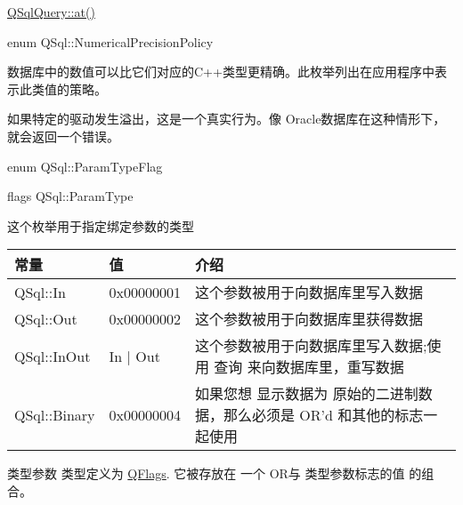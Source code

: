\begin{notice}[另请参阅]
\href{https://doc.qt.io/qt-5/qsqlquery.html#at}{QSqlQuery::at()}
\end{notice}

enum QSql::NumericalPrecisionPolicy


数据库中的数值可以比它们对应的C++类型更精确。此枚举列出在应用程序中表示此类值的策略。



\begin{notice}
如果特定的驱动发生溢出，这是一个真实行为。像 Oracle数据库在这种情形下，就会返回一个错误。
\end{notice}

enum QSql::ParamTypeFlag


flags QSql::ParamType


这个枚举用于指定绑定参数的类型

\begin{tabular}{|l|l|l|}
	\hline
	常量	& 值 & 介绍 \\
	\hline
	QSql::In&0x00000001&这个参数被用于向数据库里写入数据\\
	\hline
	QSql::Out&0x00000002&这个参数被用于向数据库里获得数据\\
	\hline
	QSql::InOut&In | Out&这个参数被用于向数据库里写入数据;使用 查询 来向数据库里，重写数据\\
	\hline
	QSql::Binary&0x00000004&如果您想 显示数据为 原始的二进制数据，那么必须是 OR'd 和其他的标志一 起使用\\
	\hline
\end{tabular}

类型参数 类型定义为 \href{https://doc.qt.io/qt-5/qflags.html}{QFlags}. 它被存放在 一个 OR与 类型参数标志的值 的组合。




